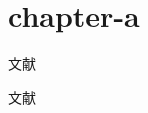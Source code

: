\chapter{chapter-a}


文献\citep{sommersd,sommersc}

文献\citep{walls,sommers,sommersB,deverell}

%




